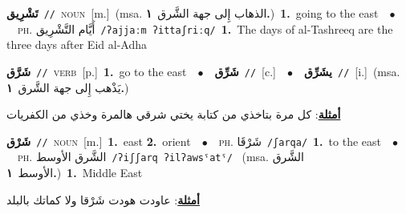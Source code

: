 \documentclass[10pt,a4paper,twoside]{article} %
\begin{document}
\begin{multicols}{2}
{\setlength\topsep{0pt}\textbf{\foreignlanguage{arabic}{تَشْرِيق}}\ {\color{gray}\texttt{//}\color{black}}\ \textsc{noun}\ [m.]\ \color{gray}(msa. \foreignlanguage{arabic}{الذهاب إِلى جهة الشَّرق}~\foreignlanguage{arabic}{\textbf{١.}})\color{black}\ \textbf{1.}~going to the east\ \ $\bullet$\ \ \textsc{ph.} \color{gray} \foreignlanguage{arabic}{أَيَّام التَّشْرِيق}\color{black}\ {\color{gray}\texttt{/{\sffamily ʔajjaːm ʔittaʃriːq}/}\color{black}}\ \textbf{1.}~The days of al-Tashreeq are the three days after Eid al-Adha\ } \vspace{2mm}

{\setlength\topsep{0pt}\textbf{\foreignlanguage{arabic}{شَرَّق}}\ {\color{gray}\texttt{//}\color{black}}\ \textsc{verb}\ [p.]\ \textbf{1.}~go to the east\ \ $\bullet$\ \ \setlength\topsep{0pt}\textbf{\foreignlanguage{arabic}{شَرِّق}}\ {\color{gray}\texttt{//}\color{black}}\ [c.]\ \ $\bullet$\ \ \setlength\topsep{0pt}\textbf{\foreignlanguage{arabic}{يشَرِّق}}\ {\color{gray}\texttt{//}\color{black}}\ [i.]\ \color{gray}(msa. \foreignlanguage{arabic}{يَذْهب إِلى جهة الشَّرق}~\foreignlanguage{arabic}{\textbf{١.}})\color{black}\  \begin{flushright}\color{gray}\foreignlanguage{arabic}{\textbf{\underline{\foreignlanguage{arabic}{أمثلة}}}: كل مرة بتاخذي من كتابة يختي شرقي هالمرة وخذي من الكفريات}\end{flushright}\color{black}} \vspace{2mm}

{\setlength\topsep{0pt}\textbf{\foreignlanguage{arabic}{شَرْق}}\ {\color{gray}\texttt{//}\color{black}}\ \textsc{noun}\ [m.]\ \textbf{1.}~east  \textbf{2.}~orient\ \ $\bullet$\ \ \textsc{ph.} \color{gray} \foreignlanguage{arabic}{شَرْقَا}\color{black}\ {\color{gray}\texttt{/{\sffamily ʃarqa}/}\color{black}}\ \textbf{1.}~to the east\ \ $\bullet$\ \ \textsc{ph.} \color{gray} \foreignlanguage{arabic}{الشَّرق الأوسط}\color{black}\ {\color{gray}\texttt{/{\sffamily ʔiʃʃarq ʔilʔawsˤatˤ}/}\color{black}}\ \color{gray} (msa. \foreignlanguage{arabic}{الشَّرق الأوسط}~\foreignlanguage{arabic}{\textbf{١.}})\color{black}\ \textbf{1.}~Middle East\  \begin{flushright}\color{gray}\foreignlanguage{arabic}{\textbf{\underline{\foreignlanguage{arabic}{أمثلة}}}: عاودت هودت شَرْقا ولا كماتك بالبلد}\end{flushright}\color{black}} \vspace{2mm}


\end{multicols}
\end{document}
